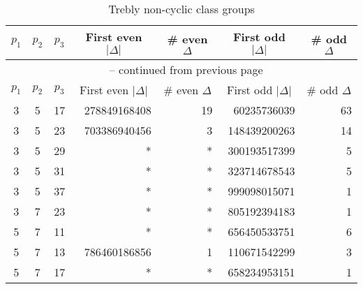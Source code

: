 \documentclass{mcom-l}
\theoremstyle{definition}
\begin{document}
\begin{longtable}[c]{| c | c | c || r | r | r | r |}
\caption{Trebly non-cyclic class groups\label{tab:NC_mult_3}}\\

\hline
$p_1$	& $p_2$	& $p_3$	& \multicolumn{1}{c|}{First even $|\Delta|$}	& \multicolumn{1}{c|}{\# even $\Delta$}	& \multicolumn{1}{c|}{First odd $|\Delta|$}	& \multicolumn{1}{c|}{\# odd $\Delta$}\\
\hline
\hline
\endfirsthead

\multicolumn{7}{c}{\normalsize{{\tablename~\thetable{}} -- continued from previous page}} \\
\hline
$p_1$	& $p_2$	& $p_3$	& \multicolumn{1}{c|}{First even $|\Delta|$}	& \multicolumn{1}{c|}{\# even $\Delta$}	& \multicolumn{1}{c|}{First odd $|\Delta|$}	& \multicolumn{1}{c|}{\# odd $\Delta$}\\
\hline
\hline
\endhead

\hline
\endfoot

\hline
\endlastfoot

3	& 5	& 17	& {278849168408}	& 19	& 60235736039	& 63\\
\hline
3	& 5	& 23	& {703386940456}	& 3	& 148439200263	& 14\\
\hline
3	& 5	& 29	& *	& *	& {300193517399}	& 5\\
\hline
3	& 5	& 31	& *	& *	& {323714678543}	& 5\\
\hline
3	& 5	& 37	& *	& *	& {999098015071}	& 1\\
\hline
3	& 7	& 23	& *	& *	& {805192394183}	& 1\\
\hline
5	& 7	& 11	& *	& *	& {656450533751}	& 6\\
\hline
5	& 7	& 13	& {786460186856}	& 1	& 110671542299	& 3\\
\hline
5	& 7	& 17	& *	& *	& {658234953151}	& 1\\
\end{longtable}
\end{document}
